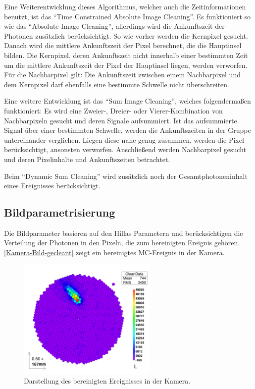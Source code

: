 Eine Weiterentwicklung dieses Algorithmus, welcher auch die Zeitinformationen benutzt, ist das ``Time Constrained Absolute Image Cleaning''. 
Es funktioniert so wie das ``Absolute Image Cleaning'', allerdings wird die Ankunftszeit der Photonen zusätzlich berücksichtigt.
So wie vorher werden die Kernpixel gesucht. 
Danach wird die mittlere Ankunftszeit der Pixel berechnet, die die Hauptinsel bilden.
Die Kernpixel, deren Ankunftszeit nicht innerhalb einer bestimmten Zeit um die mittlere Ankunftszeit der Pixel der Hauptinsel liegen, werden verworfen.
Für die Nachbarpixel gilt: Die Ankunftszeit zwischen einem Nachbarpixel und dem Kernpixel darf ebenfalls eine bestimmte Schwelle nicht überschreiten.

Eine weitere Entwicklung ist das ``Sum Image Cleaning'', welches folgendermaßen funktioniert:
Es wird eine Zweier-, Dreier- oder Vierer-Kombination von Nachbarpixeln gesucht und deren Signale aufsummiert.
Ist das aufsummierte Signal über einer bestimmten Schwelle, werden die Ankunftszeiten in der Gruppe untereinander verglichen. 
Liegen diese nahe genug zusammen, werden die Pixel berücksichtigt, ansonsten verworfen.
Anschließend werden Nachbarpixel gesucht und deren Pixelinhalte und Ankunftszeiten betrachtet.

Beim ``Dynamic Sum Cleaning'' wird zusätzlich noch der Gesamtphotoneninhalt eines Ereignisses berücksichtigt.

\subsection{Bildparametrisierung}
Die Bildparameter basieren auf den Hillas Parametern \cite{Hillas} und berücksichtigen die Verteilung der Photonen in den Pixeln, die zum bereinigten Ereignis gehören.
\autoref{Kamera-Bild-gecleant} zeigt ein bereinigtes MC-Ereignis in der Kamera.

\begin{figure}
    \centering
    \includegraphics[width=0.6\textwidth]{./Plots/03_MonteCarlos/Signal_gecleant_fertig.png}
    \caption{Darstellung des bereinigten Ereignisses in der Kamera.}
    \label{Kamera-Bild-gecleant}
\end{figure}


